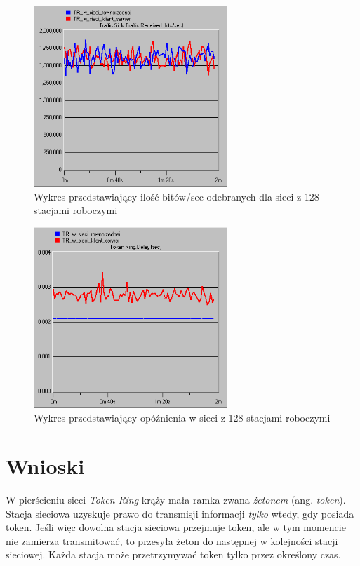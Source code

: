 \documentclass{article}
\begin{document}
\begin{figure}[H]
  \centering
  \includegraphics[width=0.65\textwidth]{screens/128_recv.png}
 \caption{Wykres przedstawiający ilość bitów/sec odebranych dla sieci z 128 stacjami roboczymi}
 \label{fig:128r}
\end{figure}

\begin{figure}[H]
  \centering
  \includegraphics[width=0.65\textwidth]{screens/128_delay.png}
 \caption{Wykres przedstawiający opóźnienia w sieci z 128 stacjami roboczymi}
 \label{fig:128d}
\end{figure}

\section{Wnioski}
W pierścieniu sieci \emph{Token Ring} krąży mała ramka zwana \emph{żetonem} (ang. \textit{token}). Stacja sieciowa uzyskuje prawo do transmisji informacji \emph{tylko} wtedy, gdy posiada token. Jeśli więc dowolna stacja sieciowa przejmuje token, ale w tym momencie nie zamierza transmitować, to przesyła żeton do następnej w kolejności stacji sieciowej. Każda stacja może przetrzymywać token tylko przez określony czas.
\end{document}
